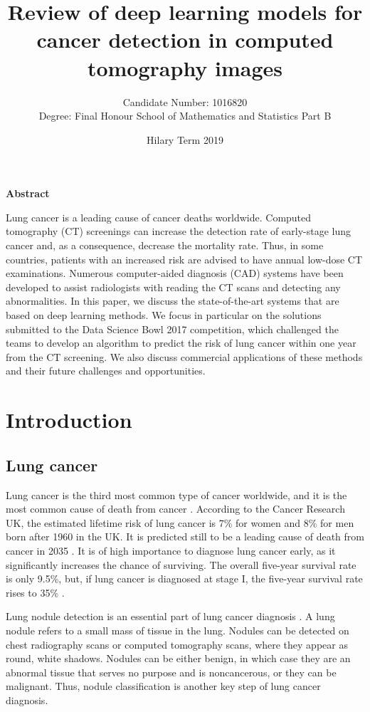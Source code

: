 \documentclass[12pt]{article}
\title{Review of deep learning models for cancer detection in computed tomography images}
\author{Candidate Number: 1016820 \\ Degree: Final Honour School of Mathematics and Statistics Part B}
\date{Hilary Term 2019}
\begin{document}
\maketitle


\centerline{\textbf{Abstract}}
Lung cancer is a leading cause of cancer deaths worldwide.  Computed tomography (CT) screenings can increase the detection rate of early-stage lung cancer and, as a consequence, decrease the mortality rate. Thus, in some countries, patients with an increased risk are advised to have annual low-dose CT examinations. Numerous computer-aided diagnosis (CAD) systems have been developed to assist radiologists with reading the CT scans and detecting any abnormalities. In this paper, we discuss the state-of-the-art systems that are based on deep learning methods. We focus in particular on the solutions submitted to the Data Science Bowl 2017 competition, which challenged the teams to develop an algorithm to predict the risk of lung cancer within one year from the CT screening. We also discuss commercial applications of these methods and their future challenges and opportunities.
\cleardoublepage
\tableofcontents
\cleardoublepage
\section{Introduction}
\subsection{Lung cancer}
Lung cancer is the third most common type of cancer worldwide, and it is the most common cause of death from cancer \citep{CancerUK}. According to the Cancer Research UK, the estimated lifetime risk of lung cancer is 7\% for women and 8\% for men born after 1960 in the UK. It is predicted still to be a leading cause of death from cancer in 2035  \citep{smittenaar2016cancer}. It is of high importance to diagnose lung cancer early, as it significantly increases the chance of surviving. The overall five-year survival rate is only 9.5\%, but, if lung cancer is diagnosed at stage I, the five-year survival rate rises to 35\% \citep{CancerUK}. 

Lung nodule detection is an essential part of lung cancer diagnosis \citep{armato2011lung}. A lung nodule refers to a small mass of tissue in the lung. Nodules can be detected on chest radiography scans or computed tomography scans, where they appear as round, white shadows. Nodules can be either benign, in which case they are an abnormal tissue that serves no purpose and is noncancerous, or they can be malignant. Thus, nodule classification is another key step of lung cancer diagnosis.
\end{document}
